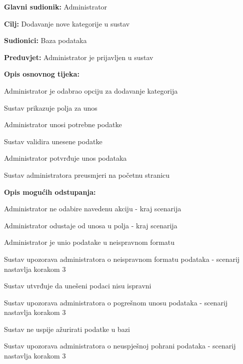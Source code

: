 					\noindent {}
					\begin{packed_item}
	
						\item \textbf{Glavni sudionik: }Administrator
						\item  \textbf{Cilj:} Dodavanje nove kategorije u sustav
						\item  \textbf{Sudionici:} Baza podataka
						\item  \textbf{Preduvjet:} Administrator je prijavljen u sustav
						\item  \textbf{Opis osnovnog tijeka:}
						
						\item[] \begin{packed_enum}
							\item Administrator je odabrao opciju za dodavanje kategorija
							\item Sustav prikazuje polja za unos
							\item Administrator unosi potrebne podatke
							\item Sustav validira unesene podatke
							\item Administrator potvrđuje unos podataka
							\item Sustav administratora preusmjeri na početnu stranicu
						\end{packed_enum}
						\item  \textbf{Opis mogućih odstupanja:}

						\item[] \begin{packed_item}
							\item[1.a] Administrator ne odabire navedenu akciju - kraj scenarija
							\item[3.a] Administrator odustaje od unosa u polja - kraj scenarija
							\item[4.a] Administrator je unio podatake u neispravnom formatu
							\item[] \begin{packed_enum}
								\item Sustav upozorava administratora o neispravnom formatu podataka - scenarij nastavlja korakom 3
							\end{packed_enum}	
							\item[6.a] Sustav utvrđuje da unešeni podaci nisu ispravni
							\item[] \begin{packed_enum}
								\item Sustav upozorava administratora o pogrešnom unosu podataka - scenarij nastavlja korakom 3
							\end{packed_enum}
							\item[6.b] Sustav ne uspije ažurirati podatke u bazi
							\item[] \begin{packed_enum}
								\item Sustav upozorava administratora o neuspješnoj pohrani podataka - scenarij nastavlja korakom 3
							\end{packed_enum}						
						\end{packed_item}
					\end{packed_item}


